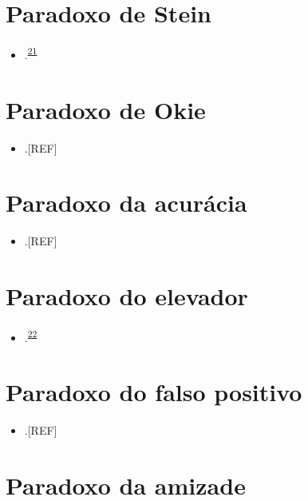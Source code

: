 \documentclass[
  a4paper,
]{book}
\providecommand{\tightlist}{%
  \setlength{\itemsep}{0pt}\setlength{\parskip}{0pt}}
\begin{document}
\hypertarget{stein}{%
\section{Paradoxo de Stein}\label{stein}}

\begin{itemize}
\tightlist
\item
  .\textsuperscript{\protect\hyperlink{ref-stein1956}{21}}
\end{itemize}

\hypertarget{okie}{%
\section{Paradoxo de Okie}\label{okie}}

\begin{itemize}
\tightlist
\item
  .{[}REF{]}
\end{itemize}

\hypertarget{acuracia}{%
\section{Paradoxo da acurácia}\label{acuracia}}

\begin{itemize}
\tightlist
\item
  .{[}REF{]}
\end{itemize}

\hypertarget{elevador}{%
\section{Paradoxo do elevador}\label{elevador}}

\begin{itemize}
\tightlist
\item
  .\textsuperscript{\protect\hyperlink{ref-de1996}{22}}
\end{itemize}

\hypertarget{falso-positivo}{%
\section{Paradoxo do falso positivo}\label{falso-positivo}}

\begin{itemize}
\tightlist
\item
  .{[}REF{]}
\end{itemize}

\hypertarget{amizade}{%
\section{Paradoxo da amizade}\label{amizade}}
\end{document}
